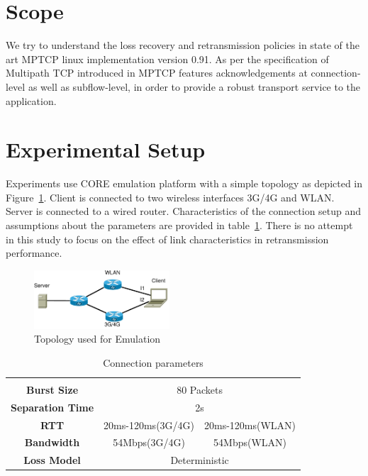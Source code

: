 \documentclass[10pt,draftcls,twocolumn]{IEEEconf}
\begin{document}
\section{Scope}\label{scope}

We try to understand the loss recovery and retransmission policies in state of the art MPTCP linux implementation version 0.91. As per the specification of Multipath TCP introduced in 
MPTCP features acknowledgements at connection-level as well as subflow-level, in order to provide a robust transport service to the application.


\section{Experimental Setup}\label{exsetup}

Experiments use CORE emulation platform with a simple topology as depicted in Figure~\ref{fig1}.
Client is connected to two wireless interfaces 3G/4G and WLAN. Server is connected to a wired router.
Characteristics of the connection setup and assumptions about the parameters are provided in table~\ref{tab1}.
There is no attempt in this study to focus on the effect of link characteristics in retransmission performance.
 
\begin{figure}[!ht]
\begin{center}
\includegraphics[angle=0, width=0.45\textwidth]{images/fortest.pdf}
\caption{Topology used for Emulation}\label{fig1}
\end{center}
\end{figure}
\begin{center}

\begin{table}
\begin{center}
\begin{tabular}{|c|cccccccccc|}
      \hline
      \multicolumn{1}{c}{} & & \\[\dimexpr-\normalbaselineskip-\arrayrulewidth]
      \textbf{Burst Size} & \multicolumn{10}{c|}{80 Packets} \\
      \hline
      \textbf{Separation Time} & \multicolumn{10}{c|}{2s} \\
      \hline

      \textbf{RTT} & \multicolumn{5}{c|}{20ms-120ms(3G/4G)} & \multicolumn{5}{c|}{20ms-120ms(WLAN)} \\
      \hline 	
      \textbf{Bandwidth} & \multicolumn{5}{c|}{54Mbps(3G/4G)} & \multicolumn{5}{c|}{54Mbps(WLAN)} \\
      \hline
      \textbf{Loss Model} & \multicolumn{10}{c|}{Deterministic}\\
      \hline
\end{tabular}
\caption{Connection parameters}\label{tab1}
\end{center}
\end{table}
\end{center}
\end{document}
